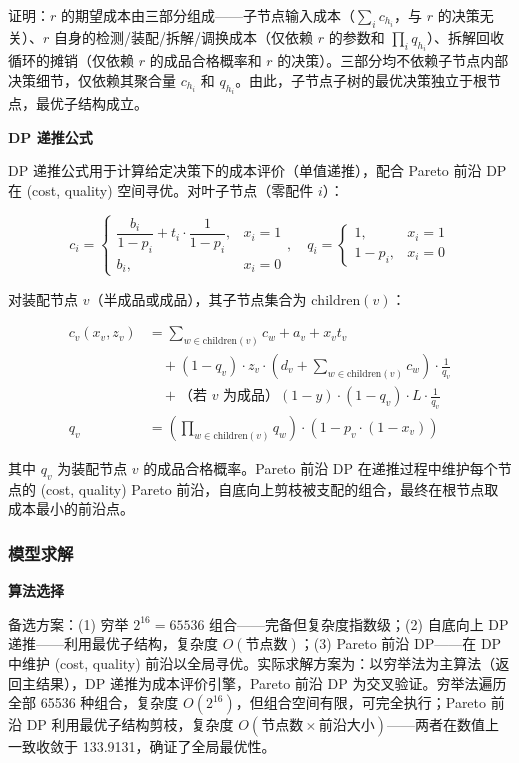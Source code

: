 \documentclass[12pt,a4paper]{ctexart}
\begin{document}
证明：$r$ 的期望成本由三部分组成——子节点输入成本（$\sum_i c_{h_i}$，与 $r$ 的决策无关）、$r$ 自身的检测/装配/拆解/调换成本（仅依赖 $r$ 的参数和 $\prod_i q_{h_i}$）、拆解回收循环的摊销（仅依赖 $r$ 的成品合格概率和 $r$ 的决策）。三部分均不依赖子节点内部决策细节，仅依赖其聚合量 $c_{h_i}$ 和 $q_{h_i}$。由此，子节点子树的最优决策独立于根节点，最优子结构成立。

\textbf{DP 递推公式}

DP 递推公式用于计算给定决策下的成本评价（单值递推），配合 Pareto 前沿 DP 在 (cost, quality) 空间寻优。对叶子节点（零配件 $i$）：

\begin{equation}
c_i = \begin{cases}
\dfrac{b_i}{1-p_i} + t_i \cdot \dfrac{1}{1-p_i}, & x_i=1 \\
b_i, & x_i=0
\end{cases}, \quad q_i = \begin{cases}
1, & x_i=1 \\
1-p_i, & x_i=0
\end{cases}
\end{equation}

对装配节点 $v$（半成品或成品），其子节点集合为 $\text{children}(v)$：

\begin{equation}
\begin{aligned}
c_v(x_v,z_v) &= \sum_{w\in\text{children}(v)} c_w + a_v + x_v t_v \\
&\quad + (1-q_v)\cdot z_v \cdot \left(d_v + \sum_{w\in\text{children}(v)} c_w\right) \cdot \frac{1}{q_v} \\
&\quad + \text{（若 $v$ 为成品）}(1-y)\cdot (1-q_v)\cdot L \cdot \frac{1}{q_v} \\
q_v &= \left(\prod_{w\in\text{children}(v)} q_w\right) \cdot (1-p_v \cdot (1-x_v))
\end{aligned}
\end{equation}

其中 $q_v$ 为装配节点 $v$ 的成品合格概率。Pareto 前沿 DP 在递推过程中维护每个节点的 (cost, quality) Pareto 前沿，自底向上剪枝被支配的组合，最终在根节点取成本最小的前沿点。

\subsubsection{模型求解}

\textbf{算法选择}

备选方案：(1) 穷举 $2^{16}=65536$ 组合——完备但复杂度指数级；(2) 自底向上 DP 递推——利用最优子结构，复杂度 $O(\text{节点数})$；(3) Pareto 前沿 DP——在 DP 中维护 (cost, quality) 前沿以全局寻优。实际求解方案为：以穷举法为主算法（返回主结果），DP 递推为成本评价引擎，Pareto 前沿 DP 为交叉验证。穷举法遍历全部 65536 种组合，复杂度 $O(2^{16})$，但组合空间有限，可完全执行；Pareto 前沿 DP 利用最优子结构剪枝，复杂度 $O(\text{节点数}\times\text{前沿大小})$——两者在数值上一致收敛于 133.9131，确证了全局最优性。
\end{document}
